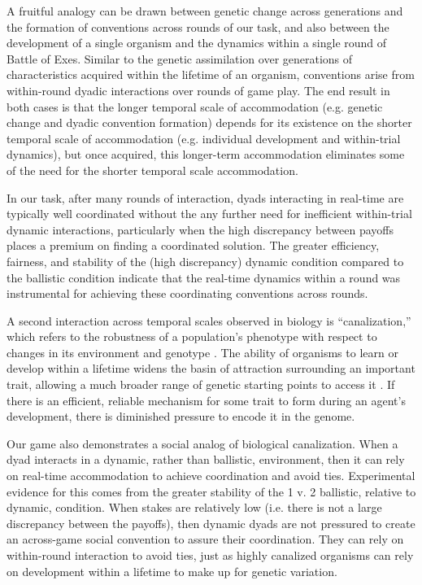 \documentclass[10pt,letterpaper]{article}
\begin{document}
A fruitful analogy can be drawn between genetic change across generations and the formation of conventions across rounds of  our task, and also between the development of a single organism and the dynamics within a single round of Battle of Exes.  Similar to the genetic assimilation over generations of characteristics acquired within the lifetime of an organism, conventions arise from within-round dyadic interactions over rounds of game play.  The end result in both cases is that the longer temporal scale of accommodation (e.g. genetic change and dyadic convention formation) depends for its existence on the shorter temporal scale of accommodation (e.g. individual development and within-trial dynamics), but once acquired, this longer-term accommodation eliminates some of the need for the shorter temporal scale accommodation.  

In our task, after many rounds of interaction,  dyads interacting in real-time are typically well coordinated without the any further need for inefficient within-trial dynamic interactions, particularly when the high discrepancy between payoffs places a premium on finding a coordinated solution. The greater efficiency, fairness, and stability of the (high discrepancy) dynamic condition compared to the ballistic condition indicate that the real-time dynamics within a round was instrumental for achieving these coordinating conventions across rounds.

A second interaction across temporal scales observed in biology is ``canalization,'' which refers to the robustness of a population's phenotype with respect to changes in its environment and genotype \cite{Waddington42_Canalization}. The ability of organisms to learn or develop within a lifetime widens the basin of attraction surrounding an important trait, allowing a much broader range of genetic starting points to access it \cite{ HintonNowlan87_LearningGuidesEvolution}. If there is an efficient, reliable mechanism for some trait to form during an agent's development, there is diminished pressure to encode it in the genome.

Our game also demonstrates a social analog of biological canalization.  When a dyad interacts in a dynamic, rather than ballistic, environment, then it can rely on real-time accommodation to achieve coordination and avoid ties.  Experimental evidence for this comes from the greater stability of the 1 v. 2 ballistic, relative to dynamic, condition.  When stakes are relatively low (i.e. there is not a large discrepancy between the payoffs), then dynamic dyads are not pressured to create an across-game social convention to assure their coordination.  They can rely on within-round interaction to avoid ties, just as highly canalized organisms can rely on development within a lifetime to make up for genetic variation.
\end{document}
